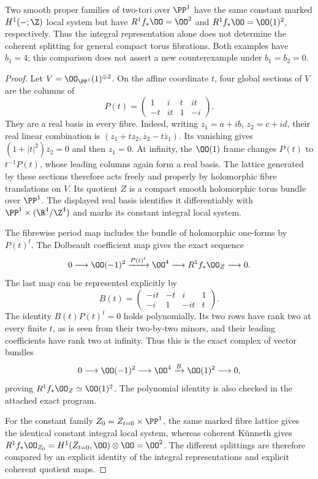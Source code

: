 
\begin{proposition}\label{cdp:st:D.1.15}

Two smooth proper families of two-tori over $\PP^1$ have the same
constant marked $H^1(-;\Z)$ local system but have
$R^1f_*\OO=\OO^2$ and $R^1f_*\OO=\OO(1)^2$, respectively.
Thus the integral representation alone does not determine the
coherent splitting for general compact torus fibrations. Both
examples have $b_1=4$; this comparison does not assert a new
counterexample under $b_1=b_2=0$.
\end{proposition}
\begin{proof}
Let $V=\OO_{\PP^1}(1)^{\oplus2}$. On the affine coordinate $t$,
four global sections of $V$ are the columns of
\[
P(t)=\begin{pmatrix}1&i&t&it\\-t&it&1&-i\end{pmatrix}.
\]
They are a real basis in every fibre. Indeed, writing
$z_1=a+ib$, $z_2=c+id$, their real linear combination is
$(z_1+t z_2,\overline z_2-t\overline z_1)$.
Its vanishing gives $(1+|t|^2)\overline z_2=0$ and then $z_1=0$.
At infinity, the $\OO(1)$ frame changes $P(t)$ to $t^{-1}P(t)$,
whose leading columns again form a real basis. The lattice
generated by these sections therefore acts freely and properly by
holomorphic fibre translations on $V$. Its quotient $Z$ is a
compact smooth holomorphic torus bundle over $\PP^1$.
The displayed real basis identifies it differentiably with
$\PP^1\times(\R^4/\Z^4)$ and marks its constant integral local
system.

The fibrewise period map includes the bundle of holomorphic
one-forms by $P(t)^t$. The Dolbeault coefficient map gives the
exact sequence
\[
0\longrightarrow\OO(-1)^2
 \xrightarrow{P(t)^t}\OO^4
 \longrightarrow R^1f_*\OO_Z\longrightarrow0.
\]
The last map can be represented explicitly by
\[
B(t)=\begin{pmatrix}-it&-t&i&1\\-i&1&-it&t\end{pmatrix}.
\]
The identity $B(t)P(t)^t=0$ holds polynomially. Its two rows have
rank two at every finite $t$, as is seen from their two-by-two
minors, and their leading coefficients have rank two at infinity.
Thus this is the exact complex of vector bundles
\[
0\longrightarrow\OO(-1)^2\longrightarrow\OO^4
 \xrightarrow{B}\OO(1)^2\longrightarrow0,
\]
proving $R^1f_*\OO_Z\simeq\OO(1)^2$. The polynomial identity is
also checked in the attached exact program.

For the constant family $Z_0=Z_{t=0}\times\PP^1$, the same
marked fibre lattice gives the identical constant integral local
system, whereas coherent K\"unneth gives
$R^1f_*\OO_{Z_0}=H^1(Z_{t=0},\OO)\otimes\OO=\OO^2$.
The different splittings are therefore compared by an explicit
identity of the integral representations and explicit coherent
quotient maps.
\end{proof}


